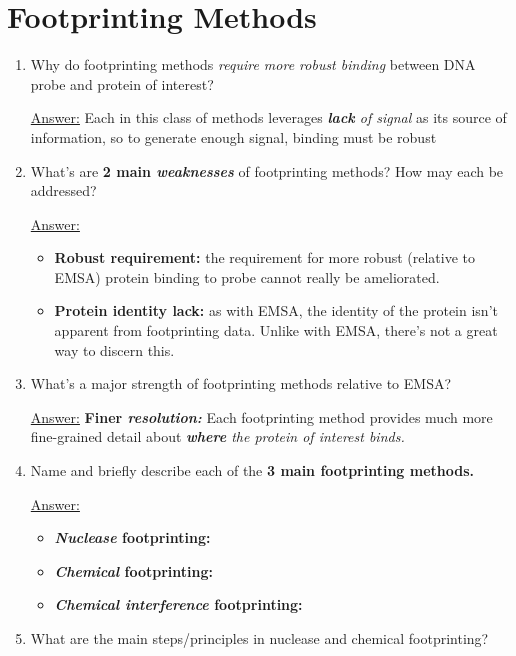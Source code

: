 \documentclass{article}
\newenvironment{QandA}{\begin{enumerate}[label=\bfseries Q\arabic*.]}
                       {\end{enumerate}}
\newenvironment{answered}{\par\normalfont\underline{Answer:}}{}
\begin{document}
\section{Footprinting Methods}
\begin{QandA}
  \item{Why do footprinting methods \textit{require more robust binding} between DNA probe and protein of interest?}
    \begin{answered}
    Each in this class of methods leverages \textit{\textbf{lack} of signal} as its source of information, so to generate enough  signal, binding must be robust
    \end{answered}
  \item{What's are \textbf{2 main \textit{weaknesses}} of footprinting methods? How may each be addressed?}
    \begin{answered}
    \begin{itemize}
      \item{\textbf{Robust requirement:} the requirement for more robust (relative to EMSA) protein binding to probe cannot really be ameliorated.}
      \item{\textbf{Protein identity lack:} as with EMSA, the identity of the protein isn't apparent from footprinting data. Unlike with EMSA, there's not a great way to discern this.}
    \end{itemize}
    \end{answered}
  \item{What's a major strength of footprinting methods relative to EMSA?}
    \begin{answered}
    \textbf{Finer \textit{resolution:}} Each footprinting method provides much more fine-grained detail about \textit{\textbf{where} the protein of interest binds.}
    \end{answered}
  \item{Name and briefly describe each of the \textbf{3 main footprinting methods.}}
    \begin{answered}
    \begin{itemize}
      \item{\textbf{\textit{Nuclease} footprinting:} }
      \item{\textbf{\textit{Chemical} footprinting:} }
      \item{\textbf{\textit{Chemical interference} footprinting:} }
    \end{itemize}
    \end{answered}
  \item{What are the main steps/principles in nuclease and chemical footprinting?}

\end{QandA}
\end{document}
